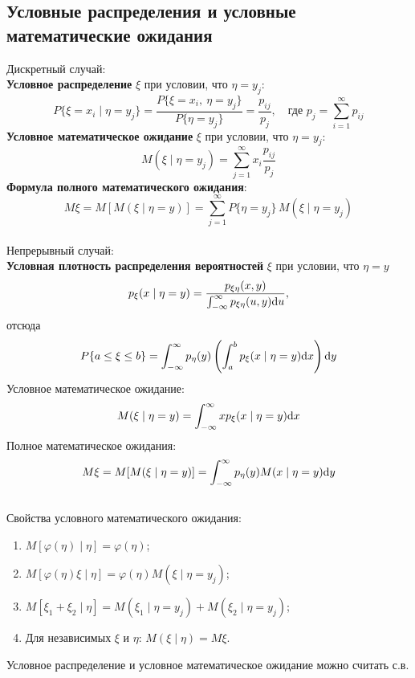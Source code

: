 \subsection{Условные распределения и условные математические ожидания}
Дискретный случай:\\
\textbf{Условное распределение} $\xi$ при условии, что $\eta = y_j$:
\begin{equation*}
    P\{\xi = x_i \mid \eta = y_j\} = \frac{P\{\xi = x_i,\ \eta = y_j\}}{P\{\eta = y_j \}} = \frac{p_{ij}}{p_j},
    \quad \text{где } p_j = \sum_{i=1}^\infty p_{ij}
\end{equation*}
\textbf{Условное математическое ожидание} $\xi$ при условии, что $\eta = y_j$:
\begin{equation*}
    M(\xi \mid \eta = y_j) = \sum_{j=1}^{\infty} x_i \frac{p_{ij}}{p_j}
\end{equation*}
\textbf{Формула полного математического ожидания}:
\begin{equation*}
    M\xi = M[M(\xi \mid \eta = y)] = \sum_{j=1}^{\infty} P\{\eta = y_j\} \, M(\xi \mid \eta = y_j)
\end{equation*}
\\
Непрерывный случай:\\
\textbf{Условная плотность распределения вероятностей} $\xi$ при условии, что $\eta = y$
\begin{equation*}
    p_\xi(x \mid \eta = y) = \frac{p_{\xi\eta}(x,y)}{\int_{-\infty}^\infty p_{\xi\eta}(u,y) \mathrm{d}{u}},
\end{equation*}
отсюда
\begin{equation*}
    P\{a \le \xi \le b\} =
    \int_{-\infty}^{\infty} p_\eta(y) \left(\int_a^b p_\xi(x \mid \eta = y) \mathrm{d}{x} \right) \mathrm{d}{y}
\end{equation*}
Условное математическое ожидание:
\begin{equation*}
    M(\xi \mid \eta = y) = \int_{-\infty}^{\infty} xp_\xi(x \mid \eta = y) \mathrm{d}{x}
\end{equation*}
Полное математическое ожидания:
\begin{equation*}
    M\xi = M[M(\xi \mid \eta = y)] = \int_{-\infty}^{\infty} p_\eta(y) M(x \mid \eta = y) \mathrm{d}{y}
\end{equation*}
\\
Свойства условного математического ожидания:
\begin{enumerate}
    \item $M[\varphi(\eta) \mid \eta] = \varphi(\eta)$;
    \item $M[\varphi(\eta)\xi \mid \eta] = \varphi(\eta) M(\xi \mid \eta = y_j)$;
    \item $M[\xi_1 + \xi_2 \mid \eta] = M(\xi_1 \mid \eta = y_j) + M(\xi_2 \mid \eta = y_j)$;
    \item Для независимых $\xi$ и $\eta$: $M(\xi \mid \eta) = M\xi$.
\end{enumerate}
Условное распределение и условное математическое ожидание можно считать с.в.

